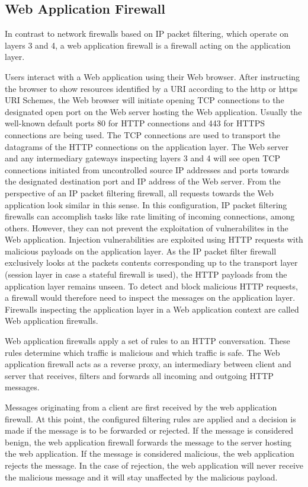 \subsection{Web Application Firewall}
In contrast to network firewalls based on IP packet filtering, which operate on layers 3 and 4, a web application firewall is a firewall acting on the application layer.

Users interact with a Web application using their Web browser.
After instructing the browser to show resources identified by a URI according to the http or https URI Schemes, the Web browser will initiate opening TCP connections to the designated open port on the Web server hosting the Web application.
Usually the well-known default ports 80 for HTTP connections and 443 for HTTPS connections are being used.
The TCP connections are used to transport the datagrams of the HTTP connections on the application layer. \cite{rfc7230}
The Web server and any intermediary gateways inspecting layers 3 and 4 will see open TCP connections initiated from uncontrolled source IP addresses and ports towards the designated destination port and IP address of the Web server.
From the perspective of an IP packet filtering firewall, all requests towards the Web application look similar in this sense.
In this configuration, IP packet filtering firewalls can accomplish tasks like rate limiting of incoming connections, among others.
However, they can not prevent the exploitation of vulnerabilites in the Web application.
Injection vulnerabilities are exploited using HTTP requests with malicious payloads on the application layer.
As the IP packet filter firewall exclusively looks at the packets contents corresponding up to the transport layer (session layer in case a stateful firewall is used), the HTTP payloads from the application layer remains unseen.
To detect and block malicious HTTP requests, a firewall would therefore need to inspect the messages on the application layer. Firewalls inspecting the application layer in a Web application context are called Web application firewalls.

Web application firewalls apply a set of rules to an HTTP conversation.
These rules determine which traffic is malicious and which traffic is safe.
The Web application firewall acts as a reverse proxy, an intermediary between client and server that receives, filters and forwards all incoming and outgoing HTTP messages. \cite{OWASP/waf,f5/waf}

Messages originating from a client are first received by the web application firewall.
At this point, the configured filtering rules are applied and a decision is made if the message is to be forwarded or rejected.
If the message is considered benign, the web application firewall forwards the message to the server hosting the web application.
If the message is considered malicious, the web application rejects the message.
In the case of rejection, the web application will never receive the malicious message and it will stay unaffected by the malicious payload.

